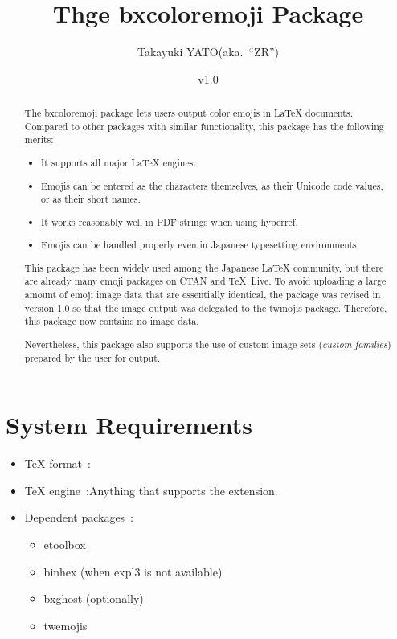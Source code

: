 \documentclass[a4paper]{article}
\newcommand{\PkgVersion}{1.0}
\newcommand{\PkgDate}{2024/11/11}
\newcommand{\Pkg}[1]{\textsf{#1}}
\newcommand{\Means}{~:\quad}
\newcommand{\／}{\mbox{}／\mbox{}}
\begin{document}
\title{Thge \Pkg{bxcoloremoji} Package}
\author{Takayuki YATO\quad (aka.~``ZR'')}
\date{v\PkgVersion \quad[\PkgDate]}
\maketitle

\begin{abstract}

The \Pkg{bxcoloremoji} package lets users output color emojis
in {\LaTeX} documents.
Compared to other packages with similar functionality,
this package has the following merits:
\begin{itemize}
\item It supports all major {\LaTeX} engines.
\item Emojis can be entered as the characters themselves,
  as their Unicode code values, or as their short names.
\item It works reasonably well in PDF strings when using \Pkg{hyperref}.
\item Emojis can be handled properly even
  in Japanese typesetting environments.
\end{itemize}

This package has been widely used among the Japanese {\LaTeX} community,
but there are already many emoji packages on CTAN and {\TeX}~Live.
To avoid uploading a large amount of emoji image data
that are essentially identical,
the package was revised in version 1.0
so that the image output was delegated to the \Pkg{twmojis} package.
Therefore, this package now contains no image data.

Nevertheless, this package also supports
the use of custom image sets (\emph{custom families})
prepared by the user for output.
\end{abstract}

\tableofcontents


\section{System Requirements}
\label{sec:Prerequisites}

\begin{itemize}
\item {\TeX} format\Means {\LaTeX}
\item {\TeX} engine\Means Anything that supports the {\eTeX} extension.
\item Dependent packages\Means
  \begin{itemize}
  \item \Pkg{etoolbox}
  \item \Pkg{binhex} (when expl3 is not available)
  \item \Pkg{bxghost} (optionally)
  \item \Pkg{twemojis}
  \end{itemize}
\end{itemize}
\end{document}
